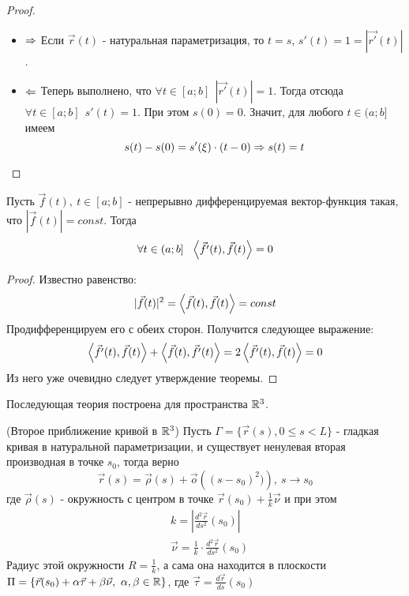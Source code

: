 \begin{proof}~
	\begin{itemize}
		\item $\Rightarrow$ Если $\vec{r}(t)$ - натуральная параметризация, то $t = s$, $s'(t) = 1 = |\vec{r'}(t)|$.
		
		\item $\Leftarrow$ Теперь выполнено, что $\forall t \in [a; b]\ \ |\vec{r'}(t)| = 1$. Тогда отсюда $\forall t \in [a; b]\ \ s'(t) = 1$. При этом $s(0) = 0$. Значит, для любого $t \in (a; b]$ имеем
		\[
			s(t) - s(0) = s'(\xi) \cdot (t - 0) \Rightarrow s(t) = t
		\]
	\end{itemize}
\end{proof}

\begin{lemma}
	Пусть $\vec{f}(t),\ t \in [a; b]$ - непрерывно дифференцируемая вектор-функция такая, что $|\vec{f}(t)| = const$. Тогда
	\[
		\forall t \in (a; b] \ \ \trbr{\vec{f'}(t), \vec{f}(t)} = 0
	\]
\end{lemma}

\begin{proof}
	Известно равенство:
	\[
		|\vec{f}(t)|^2 = \left\langle\vec{f}(t), \vec{f}(t)\right\rangle = const
	\]
	Продифференцируем его с обеих сторон. Получится следующее выражение:
	\[
		\left\langle\vec{f'}(t), \vec{f}(t)\right\rangle + \left\langle\vec{f}(t), \vec{f'}(t)\right\rangle = 2\left\langle\vec{f'}(t), \vec{f}(t)\right\rangle = 0
	\]
	Из него уже очевидно следует утверждение теоремы.
\end{proof}

\begin{note}
	Последующая теория построена для пространства $\mathbb{R}^3$.
\end{note}

\begin{theorem} (Второе приближение кривой в $\mathbb{R}^3$)
	Пусть $\Gamma = \{\vec{r}(s), 0 \le s < L\}$ - гладкая кривая в натуральной параметризации, и существует ненулевая вторая производная в точке $s_0$, тогда верно
	\[
		\vec{r}(s) = \vec{\rho}(s) + \vec{o}\left((s - s_0)^2)\right),\ s \to s_0
	\]
	где $\vec{\rho}(s)$ - окружность с центром в точке $\vec{r}(s_0) + \frac{1}{k}\vec{\nu}$ и при этом
	\begin{align*}
		&{k = \left|\frac{d^2 \vec{r}}{ds^2}(s_0)\right|}
		\\
		&{\vec{\nu} = \frac{1}{k} \cdot \frac{d^2 \vec{r}}{ds^2}(s_0)}
	\end{align*}
	Радиус этой окружности $R = \frac{1}{k}$, а сама она находится в плоскости $\Pi = \{\vec{r}(s_0) + \alpha \vec{\tau} + \beta \vec{\nu},\ \alpha, \beta \in \mathbb{R}\}$, где $\vec{\tau} = \frac{d\vec{r}}{ds}(s_0)$
\end{theorem}

